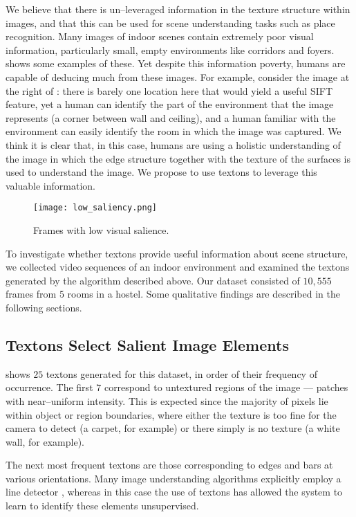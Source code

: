We believe that there is un--leveraged information in the texture
structure within images, and that this can be used for scene
understanding tasks such as place recognition. Many images of indoor
scenes contain extremely poor visual information, particularly small,
empty environments like corridors and
foyers.  shows some examples of these. Yet
despite this information poverty, humans are capable of deducing much
from these images. For example, consider the image at the right of
: there is barely one location here that
would yield a useful SIFT feature, yet a human can identify the part
of the environment that the image represents (a corner between wall
and ceiling), and a human familiar with the environment can easily
identify the room in which the image was captured. We think it is
clear that, in this case, humans are using a holistic understanding of
the image in which the edge structure together with the texture of the
surfaces is used to understand the image. We propose to use textons to
leverage this valuable information.

\begin{figure}[htp]
\centering
\texttt{[image: low\_saliency.png]}
\caption{Frames with low visual salience.}
\label{fig:low-saliency-frames}
\end{figure}

To investigate whether textons provide useful information about scene
structure, we collected video sequences of an indoor environment and
examined the textons generated by the algorithm described above. Our
dataset consisted of $10,555$ frames from $5$ rooms in a hostel. Some
qualitative findings are described in the following sections.

\subsection{Textons Select Salient Image Elements}
 shows $25$ textons generated for this
dataset, in order of their frequency of occurrence. The first $7$
correspond to untextured regions of the image --- \ie
patches with near--uniform intensity. This is expected since the
majority of pixels lie within object or region boundaries, where
either the texture is too fine for the camera to detect (a carpet,
for example) or there simply is no texture (a white wall, for
example).

The next most frequent textons are those corresponding to edges and
bars at various orientations. Many image understanding algorithms
explicitly employ a line detector \cite{Forsyth02}, whereas in this
case the use of textons has allowed the system to learn to identify
these elements unsupervised.


